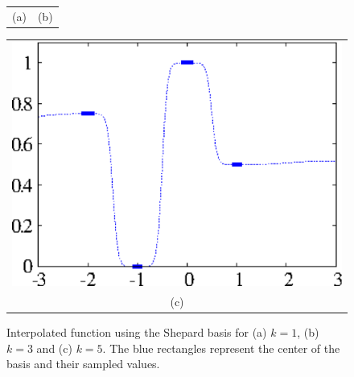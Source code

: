 \begin{figure}[!h]
\begin{tabular}{cc}
(a) & (b) \\
\end{tabular}
\begin{tabular}{c}
\includegraphics[scale=0.153]{./intShepard5.eps} \\
(c) \\
\end{tabular}
\caption{\label{fig.intShepard}Interpolated function using the Shepard basis for (a) $k=1$, (b) $k=3$ and (c) $k=5$. The blue rectangles represent the center of the basis and their sampled values.}
\end{figure}